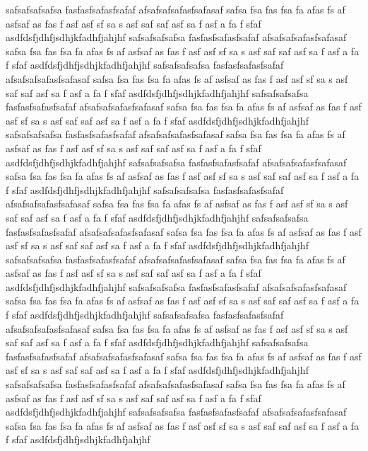 safsafsafsafsa
fasfasfsafasfsafaf
afsafsafsafasfsafasaf safsa fsa fas fsa fa afas fs af asfsaf as fas f asf asf sf sa s asf saf saf asf sa f asf a fa f sfaf asdfdsfjdhfjsdhjkfadhfjahjhf
safsafsafsafsa
fasfasfsafasfsafaf
afsafsafsafasfsafasaf safsa fsa fas fsa fa afas fs af asfsaf as fas f asf asf sf sa s asf saf saf asf sa f asf a fa f sfaf asdfdsfjdhfjsdhjkfadhfjahjhf
safsafsafsafsa
fasfasfsafasfsafaf
afsafsafsafasfsafasaf safsa fsa fas fsa fa afas fs af asfsaf as fas f asf asf sf sa s asf saf saf asf sa f asf a fa f sfaf asdfdsfjdhfjsdhjkfadhfjahjhf
safsafsafsafsa
fasfasfsafasfsafaf
afsafsafsafasfsafasaf safsa fsa fas fsa fa afas fs af asfsaf as fas f asf asf sf sa s asf saf saf asf sa f asf a fa f sfaf asdfdsfjdhfjsdhjkfadhfjahjhf
safsafsafsafsa
fasfasfsafasfsafaf
afsafsafsafasfsafasaf safsa fsa fas fsa fa afas fs af asfsaf as fas f asf asf sf sa s asf saf saf asf sa f asf a fa f sfaf asdfdsfjdhfjsdhjkfadhfjahjhf
safsafsafsafsa
fasfasfsafasfsafaf
afsafsafsafasfsafasaf safsa fsa fas fsa fa afas fs af asfsaf as fas f asf asf sf sa s asf saf saf asf sa f asf a fa f sfaf asdfdsfjdhfjsdhjkfadhfjahjhf
safsafsafsafsa
fasfasfsafasfsafaf
afsafsafsafasfsafasaf safsa fsa fas fsa fa afas fs af asfsaf as fas f asf asf sf sa s asf saf saf asf sa f asf a fa f sfaf asdfdsfjdhfjsdhjkfadhfjahjhf
safsafsafsafsa
fasfasfsafasfsafaf
afsafsafsafasfsafasaf safsa fsa fas fsa fa afas fs af asfsaf as fas f asf asf sf sa s asf saf saf asf sa f asf a fa f sfaf asdfdsfjdhfjsdhjkfadhfjahjhf
safsafsafsafsa
fasfasfsafasfsafaf
afsafsafsafasfsafasaf safsa fsa fas fsa fa afas fs af asfsaf as fas f asf asf sf sa s asf saf saf asf sa f asf a fa f sfaf asdfdsfjdhfjsdhjkfadhfjahjhf
safsafsafsafsa
fasfasfsafasfsafaf
afsafsafsafasfsafasaf safsa fsa fas fsa fa afas fs af asfsaf as fas f asf asf sf sa s asf saf saf asf sa f asf a fa f sfaf asdfdsfjdhfjsdhjkfadhfjahjhf
safsafsafsafsa
fasfasfsafasfsafaf
afsafsafsafasfsafasaf safsa fsa fas fsa fa afas fs af asfsaf as fas f asf asf sf sa s asf saf saf asf sa f asf a fa f sfaf asdfdsfjdhfjsdhjkfadhfjahjhf
safsafsafsafsa
fasfasfsafasfsafaf
afsafsafsafasfsafasaf safsa fsa fas fsa fa afas fs af asfsaf as fas f asf asf sf sa s asf saf saf asf sa f asf a fa f sfaf asdfdsfjdhfjsdhjkfadhfjahjhf
safsafsafsafsa
fasfasfsafasfsafaf
afsafsafsafasfsafasaf safsa fsa fas fsa fa afas fs af asfsaf as fas f asf asf sf sa s asf saf saf asf sa f asf a fa f sfaf asdfdsfjdhfjsdhjkfadhfjahjhf
safsafsafsafsa
fasfasfsafasfsafaf
afsafsafsafasfsafasaf safsa fsa fas fsa fa afas fs af asfsaf as fas f asf asf sf sa s asf saf saf asf sa f asf a fa f sfaf asdfdsfjdhfjsdhjkfadhfjahjhf
